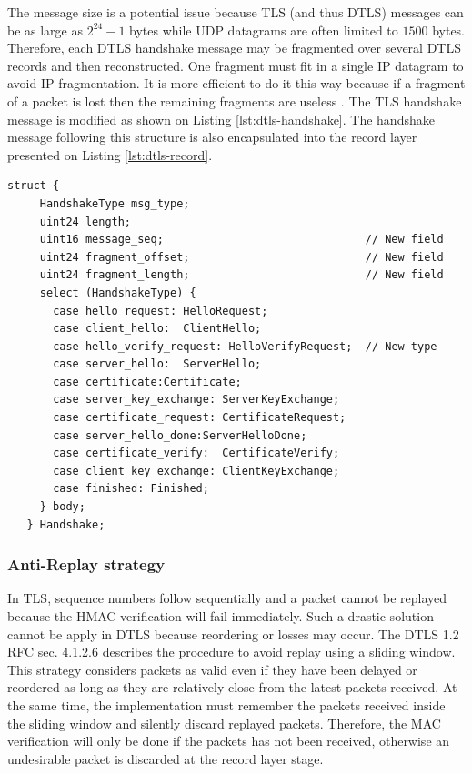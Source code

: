 The message size is a potential issue because TLS (and thus DTLS) messages can be as large as $2^{24}-1$ bytes while UDP datagrams are often limited to $1500$ bytes. Therefore, each DTLS handshake message may be fragmented over several DTLS records and then reconstructed. One fragment must fit in a single IP datagram to avoid IP fragmentation.  It is more efficient to do it this way because if a fragment of a packet is lost then the remaining fragments are useless . The TLS handshake message is modified as shown on Listing \ref{lst:dtls-handshake}. The handshake message following this structure is also encapsulated into the record layer presented on Listing \ref{lst:dtls-record}.

\begin{lstlisting}[caption=DTLS handshake message, label=lst:dtls-handshake]
   struct {
     HandshakeType msg_type;
     uint24 length;
     uint16 message_seq;                               // New field
     uint24 fragment_offset;                           // New field
     uint24 fragment_length;                           // New field
     select (HandshakeType) {
       case hello_request: HelloRequest;
       case client_hello:  ClientHello;
       case hello_verify_request: HelloVerifyRequest;  // New type
       case server_hello:  ServerHello;
       case certificate:Certificate;
       case server_key_exchange: ServerKeyExchange;
       case certificate_request: CertificateRequest;
       case server_hello_done:ServerHelloDone;
       case certificate_verify:  CertificateVerify;
       case client_key_exchange: ClientKeyExchange;
       case finished: Finished;
     } body;
   } Handshake;
\end{lstlisting}

\subsubsection{Anti-Replay strategy}

In TLS, sequence numbers follow sequentially and a packet cannot be replayed because the HMAC verification will fail immediately. Such a drastic solution cannot be apply in DTLS because reordering or losses may occur. The DTLS 1.2 RFC \cite{rfc6347} sec. 4.1.2.6 describes the procedure to avoid replay using a sliding window. This strategy considers packets as valid even if they have been delayed or reordered as long as they are relatively close from the latest packets received. At the same time, the implementation must remember the packets received inside the sliding window and silently discard replayed packets. Therefore, the MAC verification will only be done if the packets has not been received, otherwise an undesirable packet is discarded at the record layer stage.


